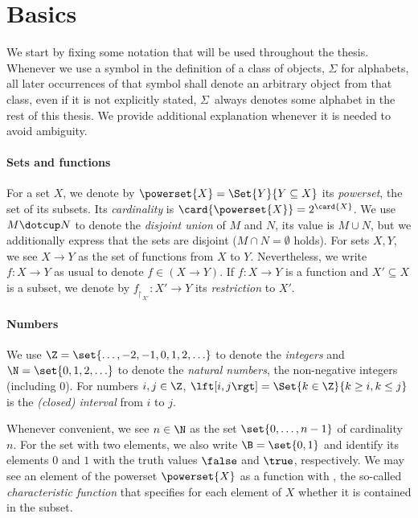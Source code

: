 \documentclass[../../diss.tex]{subfiles}
\begin{document}
\section{Basics}%
\label{Section:PrelimsBasics}%

We start by fixing some notation that will be used throughout the thesis.
Whenever we use a symbol in the definition of a class of objects, \eg $\Sigma$ for alphabets, all later occurrences of that symbol shall denote an arbitrary object from that class, even if it is not explicitly stated, \mbox{\eg $\Sigma$ always} denotes some alphabet in the rest of this thesis.
We provide additional explanation whenever it is needed to avoid ambiguity.

\paragraph{Sets and functions}

For a set $X$, we denote by $\powerset{X} = \Set{ Y }{Y \subseteq X}$ its \emph{powerset}, the set of its subsets.
Its \emph{cardinality} is $\card{\powerset{X}} = 2^{\card{X}}$.
We use $M \dotcup N$ to denote the \emph{disjoint union} of $M$ and $N$, \ie its value is $M \cup N$, but we additionally express that the sets are disjoint ($M \cap N = \emptyset$ holds).
For sets $X, Y$, we see $X \to Y$ as the set of functions from $X$ to $Y$.
Nevertheless, we write $f \colon X \to Y$ as usual to denote $f \in (X \to Y)$.
If $f \colon X \to Y$ is a function and $X' \subseteq X$ is a subset, we denote by $f_{\restriction_{X'}} \colon X' \to Y$ its \emph{restriction} to $X'$.

\paragraph{Numbers}

We use $\Z = \set{ \ldots, -2, -1, 0, 1, 2, \ldots}$ to denote the \emph{integers} and $\N = \set{0, 1, 2, \ldots}$ to denote the \emph{natural numbers}, the non-negative integers (including $0$).
For numbers $i,j \in \Z$, $\fromto{i}{j} = \Set{ k \in \Z  }{ k \geq i, k \leq j}$ is the \emph{(closed) interval} from $i$ to $j$.


Whenever convenient, we see $n \in \N$ as the set $\set{0, \ldots, n-1}$ of cardinality $n$.
For the set with two elements, we also write $\B = \set{0,1}$ and identify its elements $0$ and $1$ with the truth values $\false$ and $\true$, respectively.
We may see an element of the powerset $\powerset{X}$ as a function with , the so-called \emph{characteristic function} that specifies for each element of $X$ whether it is contained in the subset.
\end{document}
